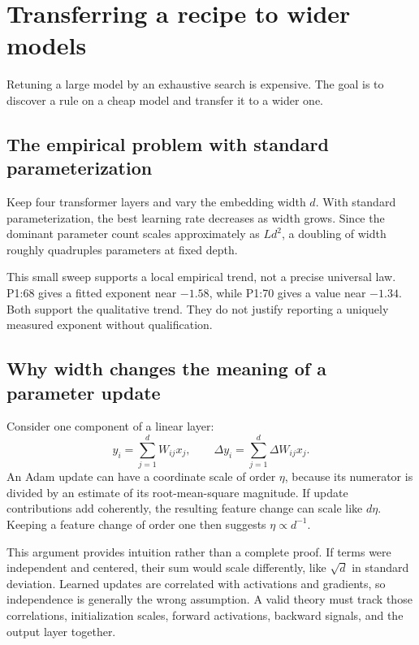 \chapter{Transferring a recipe to wider models}
\label{ch:width}

Retuning a large model by an exhaustive search is expensive. The goal is to discover a rule on a cheap model and transfer it to a wider one.

\section{The empirical problem with standard parameterization}
Keep four transformer layers and vary the embedding width $d$. With standard parameterization, the best learning rate decreases as width grows. Since the dominant parameter count scales approximately as $Ld^2$, a doubling of width roughly quadruples parameters at fixed depth.


This small sweep supports a local empirical trend, not a precise universal law. P1:68 gives a fitted exponent near $-1.58$, while P1:70 gives a value near $-1.34$. Both support the qualitative trend. They do not justify reporting a uniquely measured exponent without qualification.

\section{Why width changes the meaning of a parameter update}
Consider one component of a linear layer:
\[
y_i=\sum_{j=1}^{d}W_{ij}x_j,
\qquad
\Delta y_i=\sum_{j=1}^{d}\Delta W_{ij}x_j.
\]
An Adam update can have a coordinate scale of order $\eta$, because its numerator is divided by an estimate of its root-mean-square magnitude. If update contributions add coherently, the resulting feature change can scale like $d\eta$. Keeping a feature change of order one then suggests $\eta\propto d^{-1}$.

This argument provides intuition rather than a complete proof. If terms were independent and centered, their sum would scale differently, like $\sqrt d$ in standard deviation. Learned updates are correlated with activations and gradients, so independence is generally the wrong assumption. A valid theory must track those correlations, initialization scales, forward activations, backward signals, and the output layer together.

